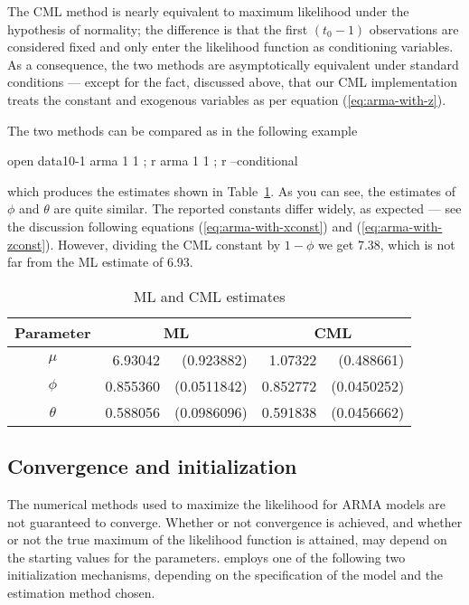 The CML method is nearly equivalent to maximum likelihood under the
hypothesis of normality; the difference is that the first $(t_0 - 1)$
observations are considered fixed and only enter the likelihood
function as conditioning variables. As a consequence, the two methods
are asymptotically equivalent under standard conditions --- except for
the fact, discussed above, that our CML implementation treats the
constant and exogenous variables as per equation (\ref{eq:arma-with-z}).

The two methods can be compared as in the following example
\begin{code}
open data10-1
arma 1 1 ; r
arma 1 1 ; r --conditional
\end{code}
which produces the estimates shown in Table~\ref{tab:ml-cml}.  As you
can see, the estimates of $\phi$ and $\theta$ are quite similar.  The
reported constants differ widely, as expected --- see the discussion
following equations (\ref{eq:arma-with-xconst}) and
(\ref{eq:arma-with-zconst}).  However, dividing the CML constant by
$1-\phi$ we get 7.38, which is not far from the ML estimate of 6.93.

\begin{table}[htbp]
\caption{ML and CML estimates}
\label{tab:ml-cml}
\begin{center}
  \begin{tabular}{crrrr}
    \hline
    Parameter & \multicolumn{2}{c}{ML} &
    \multicolumn{2}{c}{CML} \\
    \hline 
    $\mu$ & 6.93042 & (0.923882) & 1.07322 & (0.488661) \\
    $\phi$ & 0.855360 & (0.0511842) & 0.852772 & (0.0450252) \\
    $\theta$ & 0.588056 & (0.0986096) & 0.591838 & (0.0456662) \\
    \hline
  \end{tabular}
\end{center}
\end{table}

\subsection{Convergence and initialization}

The numerical methods used to maximize the likelihood for ARMA models
are not guaranteed to converge.  Whether or not convergence is
achieved, and whether or not the true maximum of the likelihood
function is attained, may depend on the starting values for the
parameters.   employs one of the following two
initialization mechanisms, depending on the specification of the model
and the estimation method chosen.

